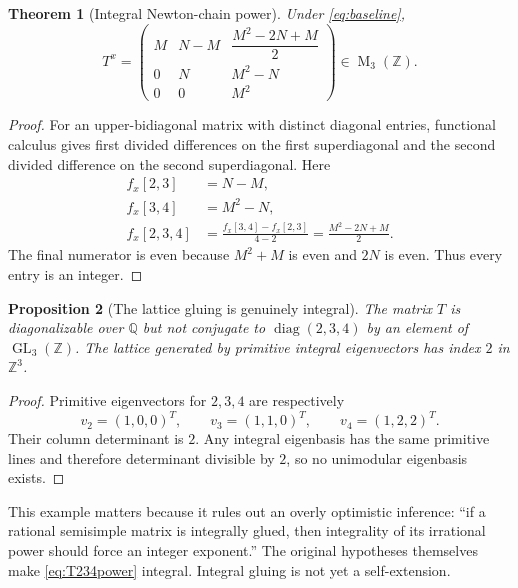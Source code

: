 \documentclass[11pt,oneside]{article}
\newtheorem{theorem}{Theorem}[section]
\newtheorem{proposition}[theorem]{Proposition}
\theoremstyle{definition}
\theoremstyle{remark}
\newcommand{\Z}{\mathbb Z}
\newcommand{\Q}{\mathbb Q}
\newcommand{\Mat}{\operatorname{M}}
\newcommand{\diag}{\operatorname{diag}}
\begin{document}
\begin{theorem}[Integral Newton-chain power]
\label{thm:T234power}
Under \eqref{eq:baseline},
\begin{equation}
 T^x=
 \begin{pmatrix}
 M&N-M&\dfrac{M^2-2N+M}{2}\\[1ex]
 0&N&M^2-N\\
 0&0&M^2
 \end{pmatrix}
 \in\Mat_3(\Z).
 \label{eq:T234power}
\end{equation}
\end{theorem}

\begin{proof}
For an upper-bidiagonal matrix with distinct diagonal entries, functional calculus gives first
divided differences on the first superdiagonal and the second divided difference on the
second superdiagonal.  Here
\begin{align*}
 f_x[2,3]&=N-M,\\
 f_x[3,4]&=M^2-N,\\
 f_x[2,3,4]
 &=\frac{f_x[3,4]-f_x[2,3]}{4-2}
 =\frac{M^2-2N+M}{2}.
\end{align*}
The final numerator is even because $M^2+M$ is even and $2N$ is even.  Thus every entry is an
integer.
\end{proof}

\begin{proposition}[The lattice gluing is genuinely integral]
\label{prop:index2}
The matrix $T$ is diagonalizable over $\Q$ but not conjugate to $\diag(2,3,4)$ by an element of
$\operatorname{GL}_3(\Z)$.  The lattice generated by primitive integral eigenvectors has index
$2$ in $\Z^3$.
\end{proposition}

\begin{proof}
Primitive eigenvectors for $2,3,4$ are respectively
\[
 v_2=(1,0,0)^T,\qquad
 v_3=(1,1,0)^T,\qquad
 v_4=(1,2,2)^T.
\]
Their column determinant is $2$.  Any integral eigenbasis has the same primitive lines and
therefore determinant divisible by $2$, so no unimodular eigenbasis exists.
\end{proof}

This example matters because it rules out an overly optimistic inference: ``if a rational
semisimple matrix is integrally glued, then integrality of its irrational power should force
an integer exponent.''  The original hypotheses themselves make \eqref{eq:T234power}
integral.  Integral gluing is not yet a self-extension.
\end{document}

